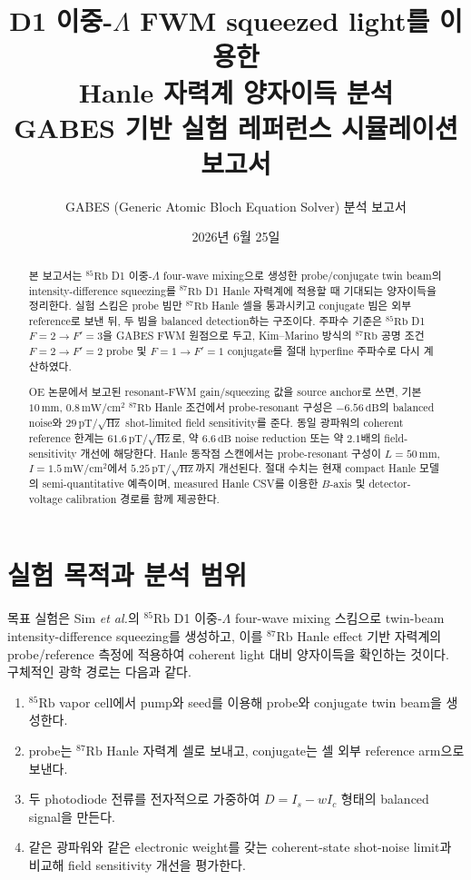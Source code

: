 \documentclass[11pt,a4paper]{article}
\title{\textbf{\Rb{85} D1 이중-\(\Lambda\) FWM squeezed light를 이용한\\
\Rb{87} Hanle 자력계 양자이득 분석}\\[4pt]
\large GABES 기반 실험 레퍼런스 시뮬레이션 보고서}
\author{GABES (Generic Atomic Bloch Equation Solver) 분석 보고서}
\date{2026년 6월 25일}
\newcommand{\dB}{\,\mathrm{dB}}
\newcommand{\pT}{\,\mathrm{pT}}
\newcommand{\sqrtHz}{/\sqrt{\mathrm{Hz}}}
\newcommand{\Rb}[1]{\({}^{#1}\mathrm{Rb}\)}
\newcommand{\FWM}{four-wave mixing}
\newcommand{\IDS}{intensity-difference squeezing}
\begin{document}
\maketitle

\begin{abstract}
\noindent
본 보고서는 \Rb{85} D1 이중-\(\Lambda\) \FWM{}으로 생성한 probe/conjugate twin beam의
\IDS{}를 \Rb{87} D1 Hanle 자력계에 적용할 때 기대되는 양자이득을 정리한다.
실험 스킴은 probe 빔만 \Rb{87} Hanle 셀을 통과시키고 conjugate 빔은 외부 reference로 보낸 뒤,
두 빔을 balanced detection하는 구조이다. 주파수 기준은 \Rb{85} D1
\(F=2\to F'=3\)을 GABES FWM 원점으로 두고, Kim--Marino 방식의 \Rb{87} 공명 조건
\(F=2\to F'=2\) probe 및 \(F=1\to F'=1\) conjugate를 절대 hyperfine 주파수로 다시 계산하였다.

OE 논문에서 보고된 resonant-FWM gain/squeezing 값을 source anchor로 쓰면,
기본 \(10\,\mathrm{mm}\), \(0.8\,\mathrm{mW/cm^2}\) \Rb{87} Hanle 조건에서
probe-resonant 구성은 \(-6.56\dB\)의 balanced noise와
\(29\pT\sqrtHz\) shot-limited field sensitivity를 준다.
동일 광파워의 coherent reference 한계는 \(61.6\pT\sqrtHz\)로, 약 \(6.6\dB\)
noise reduction 또는 약 \(2.1\)배의 field-sensitivity 개선에 해당한다.
Hanle 동작점 스캔에서는 probe-resonant 구성이 \(L=50\,\mathrm{mm}\),
\(I=1.5\,\mathrm{mW/cm^2}\)에서 \(5.25\pT\sqrtHz\)까지 개선된다.
절대 수치는 현재 compact Hanle 모델의 semi-quantitative 예측이며, measured Hanle CSV를 이용한
\(B\)-axis 및 detector-voltage calibration 경로를 함께 제공한다.
\end{abstract}

\tableofcontents
\bigskip

\section{실험 목적과 분석 범위}

목표 실험은 Sim \textit{et al.}의 \Rb{85} D1 이중-\(\Lambda\) \FWM{} 스킴으로
twin-beam \IDS{}를 생성하고, 이를 \Rb{87} Hanle effect 기반 자력계의 probe/reference 측정에
적용하여 coherent light 대비 양자이득을 확인하는 것이다. 구체적인 광학 경로는 다음과 같다.

\begin{enumerate}[nosep]
\item \Rb{85} vapor cell에서 pump와 seed를 이용해 probe와 conjugate twin beam을 생성한다.
\item probe는 \Rb{87} Hanle 자력계 셀로 보내고, conjugate는 셀 외부 reference arm으로 보낸다.
\item 두 photodiode 전류를 전자적으로 가중하여
      \(D=I_s-wI_c\) 형태의 balanced signal을 만든다.
\item 같은 광파워와 같은 electronic weight를 갖는 coherent-state shot-noise limit과 비교해
      field sensitivity 개선을 평가한다.
\end{enumerate}
\end{document}
